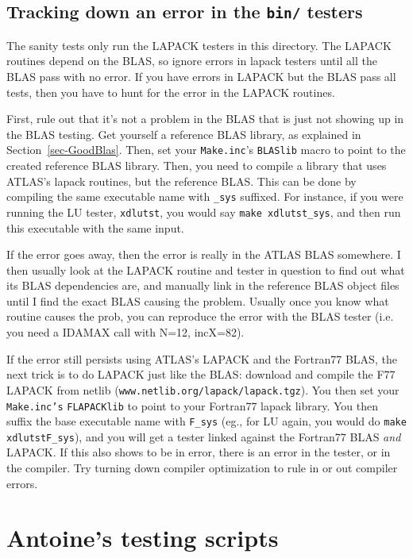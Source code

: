 \documentclass[11pt]{article}
\begin{document}
\subsection{Tracking down an error in the {\tt bin/} testers}
\label{sec-LapackDebug}

The sanity tests only run the LAPACK testers in this directory.  The LAPACK
routines depend on the BLAS, so ignore errors in lapack testers until all
the BLAS pass with no error.  If you have errors in LAPACK but the BLAS pass
all tests, then you have to hunt for the error in the LAPACK routines.

First, rule out that it's not a problem in the BLAS that is just not showing
up in the BLAS testing.  Get yourself a reference BLAS library, as explained
in Section~\ref{sec-GoodBlas}.  Then, set your {\tt Make.inc}'s {\tt BLASlib}
macro to point to the created reference BLAS library.  Then, you need to
compile a library that uses ATLAS's lapack routines, but the reference
BLAS.  This can be done by compiling the same executable name with {\tt \_sys}
suffixed.  For instance, if you were running the LU tester, {\tt xdlutst},
you would say {\tt make xdlutst\_sys}, and then run this executable with
the same input.

If the error goes away, then the error is really in the ATLAS BLAS somewhere.
I then usually look at the LAPACK routine and tester in question to find out
what its BLAS dependencies are, and manually link in the reference BLAS
object files until I find the exact BLAS causing the problem.  Usually
once you know what routine causes the prob, you can reproduce the error
with the BLAS tester (i.e. you need a IDAMAX call with N=12, incX=82).

If the error still persists using ATLAS's LAPACK and the Fortran77 BLAS,
the next trick is to do LAPACK just like the BLAS: download and compile the F77
LAPACK from netlib ({\tt www.netlib.org/lapack/lapack.tgz}).  You then
set your {\tt Make.inc's} {\tt FLAPACKlib} to point to your Fortran77 lapack
library.  You then suffix the base executable name with {\tt F\_sys} (eg., for
LU again, you would do {\tt make xdlutstF\_sys}), and
you will get a tester linked against the Fortran77 BLAS {\em and} LAPACK.
If this also shows to be in error, there is an error in the tester, or in
the compiler.  Try turning down compiler optimization to rule in or out
compiler errors.

\section{Antoine's testing scripts}
\end{document}
